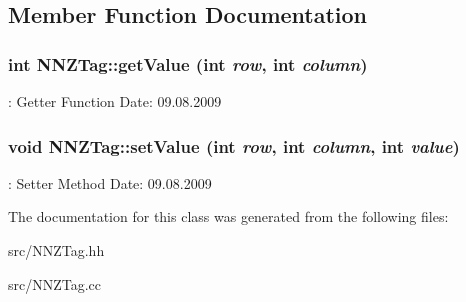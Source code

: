 \subsection{Member Function Documentation}
\hypertarget{classNNZTag_ab93956ff16797fdb7c1e55eeb2e3549c}{
\subsubsection[{getValue}]{\setlength{\rightskip}{0pt plus 5cm}int NNZTag::getValue (int {\em row}, \/  int {\em column})}}
\label{classNNZTag_ab93956ff16797fdb7c1e55eeb2e3549c}
: Getter Function  Date: 09.08.2009 \hypertarget{classNNZTag_a88006fcd4a4d2386c16f196c2cc2b08c}{
\subsubsection[{setValue}]{\setlength{\rightskip}{0pt plus 5cm}void NNZTag::setValue (int {\em row}, \/  int {\em column}, \/  int {\em value})}}
\label{classNNZTag_a88006fcd4a4d2386c16f196c2cc2b08c}
: Setter Method  Date: 09.08.2009 

The documentation for this class was generated from the following files:\begin{DoxyCompactItemize}
\item 
src/NNZTag.hh\item 
src/NNZTag.cc\end{DoxyCompactItemize}
